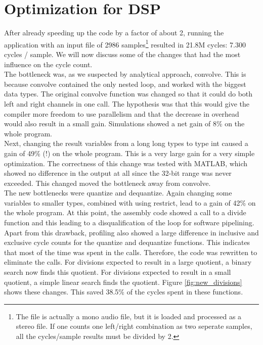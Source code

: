 \documentclass[a4paper]{article}
\begin{document}
\section{Optimization for DSP}
After already speeding up the code by a factor of about 2, running the application with an input file of 2986 samples\footnote{The file is actually a mono audio file, but it is loaded and processed as a stereo file. If one counts one left/right combination as two seperate samples, all the cycles/sample results must be divided by 2.} resulted in 21.8M cycles: 7.300 cycles / sample. We will now discuss some of the changes that had the most influence on the cycle count. \\

The bottleneck was, as we suspected by analytical approach, convolve. This is because convolve contained the only nested loop, and worked with the biggest data types. The original convolve function was changed so that it could do both left and right channels in one call. The hypothesis was that this would give the compiler more freedom to use parallelism and that the decrease in overhead would also result in a small gain. Simulations showed a net gain of 8\% on the whole program.\\

Next, changing the result variables from a long long types to type int caused a gain of 49\% (!) on the whole program. This is a very large gain for a very simple optimization. The correctness of this change was tested with MATLAB, which showed no difference in the output at all since the 32-bit range was never exceeded. This changed moved the bottleneck away from convolve.\\

The new bottlenecks were quantize and dequantize. Again changing some variables to smaller types, combined with using restrict, lead to a gain of 42\% on the whole program. At this point, the assembly code showed a call to a divide function and this leading to a disqualification of the loop for software pipelining. Apart from this drawback, profiling also showed a large difference in inclusive and exclusive cycle counts for the quantize and dequantize functions. This indicates that most of the time was spent in the calls. Therefore, the code was rewritten to eliminate the calls. For divisions expected to result in a large quotient, a binary search now finds this quotient. For divisions expected to result in a small quotient, a simple linear search finds the quotient. Figure \ref{fig:new_divisions} shows these changes. This saved 38.5\% of the cycles spent in these functions.\\
\end{document}

